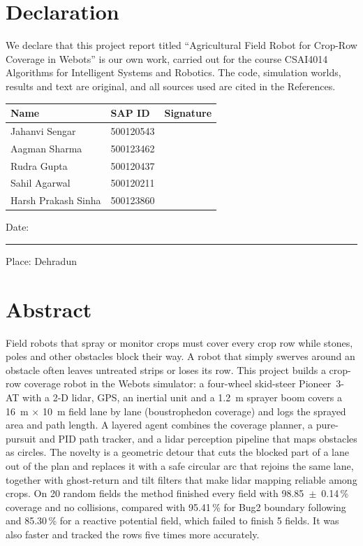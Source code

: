\documentclass[12pt,a4paper]{article}
\begin{document}
\setcounter{page}{1}
\section*{Declaration}
We declare that this project report titled ``Agricultural Field Robot for Crop-Row Coverage in Webots'' is our own work, carried out for the course CSAI4014 Algorithms for Intelligent Systems and Robotics. The code, simulation worlds, results and text are original, and all sources used are cited in the References.

\vspace{1cm}
\renewcommand{\arraystretch}{2.2}
\begin{tabular}{|P{5.2cm}|P{3cm}|P{4.5cm}|}
\hline
\textbf{Name} & \textbf{SAP ID} & \textbf{Signature} \\ \hline
Jahanvi Sengar & 500120543 & \\ \hline
Aagman Sharma & 500123462 & \\ \hline
Rudra Gupta & 500120437 & \\ \hline
Sahil Agarwal & 500120211 & \\ \hline
Harsh Prakash Sinha & 500123860 & \\ \hline
\end{tabular}
\renewcommand{\arraystretch}{1.2}

\vspace{0.8cm}
Date: \rule{4cm}{0.4pt} \hfill Place: Dehradun
\newpage

\section*{Abstract}
Field robots that spray or monitor crops must cover every crop row while stones, poles and other obstacles block their way. A robot that simply swerves around an obstacle often leaves untreated strips or loses its row. This project builds a crop-row coverage robot in the Webots simulator: a four-wheel skid-steer Pioneer~3-AT with a 2-D lidar, GPS, an inertial unit and a 1.2~m sprayer boom covers a 16~m $\times$ 10~m field lane by lane (boustrophedon coverage) and logs the sprayed area and path length. A layered agent combines the coverage planner, a pure-pursuit and PID path tracker, and a lidar perception pipeline that maps obstacles as circles. The novelty is a geometric detour that cuts the blocked part of a lane out of the plan and replaces it with a safe circular arc that rejoins the same lane, together with ghost-return and tilt filters that make lidar mapping reliable among crops. On 20 random fields the method finished every field with 98.85~$\pm$~0.14\,\% coverage and no collisions, compared with 95.41\,\% for Bug2 boundary following and 85.30\,\% for a reactive potential field, which failed to finish 5 fields. It was also faster and tracked the rows five times more accurately.
\end{document}
